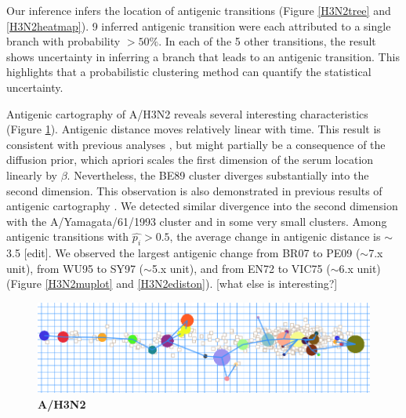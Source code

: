 \documentclass[11pt,oneside,letterpaper]{article}
\begin{document}
Our inference infers the location of antigenic transitions (Figure \ref{H3N2tree} and \ref{H3N2heatmap}). 
9 inferred antigenic transition were each attributed to a single branch with probability $>50\%$. In each of the 5 other transitions, the result shows uncertainty in inferring a branch that leads to an antigenic transition. 
This highlights that a probabilistic clustering method can quantify the statistical uncertainty. %




Antigenic cartography of A/H3N2 reveals several interesting characteristics (Figure \ref{H3N2Euclid}). 
Antigenic distance moves relatively linear with time.  
This result is consistent with previous analyses \cite{smith_mapping_2004, bedford_integrating_2014}, but might partially be a consequence of the diffusion prior, which apriori scales the first dimension of the serum location linearly by $\beta$. 
Nevertheless, the BE89 cluster diverges substantially into the second dimension. This observation is also demonstrated in previous results of antigenic cartography \cite{smith_mapping_2004, bedford_integrating_2014}. 
 We detected similar divergence into the second dimension with the A/Yamagata/61/1993 cluster and in some very small clusters. Among antigenic transitions with $\hat{p_i} > 0.5$, the average change in antigenic distance is $\sim$3.5 [edit]. 
 We observed the largest antigenic change from BR07 to PE09 ($\sim$7.x unit), from WU95 to SY97 ($\sim$5.x unit), and from EN72 to VIC75 ($\sim$6.x unit) (Figure \ref{H3N2muplot} and \ref{H3N2ediston}).
[what else is interesting?]




\begin{figure}[h]
	\centering		
	\includegraphics[width=1\textwidth]{figures/custom/H3N2Euclid}
	\caption{\textbf{A/H3N2}
	 		} 
	\label{H3N2Euclid} 
\end{figure}
\end{document}
